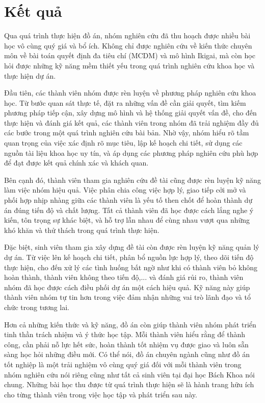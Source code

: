 \section{Kết quả}
    Qua quá trình thực hiện đồ án, nhóm nghiên cứu đã thu hoạch được nhiều bài học vô cùng quý giá và bổ ích. Không chỉ được nghiên cứu về kiến thức chuyên môn về bài toán quyết định đa tiêu chí (MCDM) và mô hình Ikigai, mà còn học hỏi được những kỹ năng mềm thiết yếu trong quá trình nghiên cứu khoa học và thực hiện dự án.
    
    Đầu tiên, các thành viên nhóm được rèn luyện về phương pháp nghiên cứu khoa học. Từ bước quan sát thực tế, đặt ra những vấn đề cần giải quyết, tìm kiếm phương pháp tiếp cận, xây dựng mô hình và hệ thống giải quyết vấn đề, cho đến thực hiện và đánh giá kết quả, các thành viên trong nhóm đã trải nghiệm đầy đủ các bước trong một quá trình nghiên cứu bài bản. Nhờ vậy, nhóm hiểu rõ tầm quan trọng của việc xác định rõ mục tiêu, lập kế hoạch chi tiết, sử dụng các nguồn tài liệu khoa học uy tín, và áp dụng các phương pháp nghiên cứu phù hợp để đạt được kết quả chính xác và khách quan.
    
    Bên cạnh đó, thành viên tham gia nghiên cứu đề tài cũng được rèn luyện kỹ năng làm việc nhóm hiệu quả. Việc phân chia công việc hợp lý, giao tiếp cởi mở và phối hợp nhịp nhàng giữa các thành viên là yếu tố then chốt để hoàn thành dự án đúng tiến độ và chất lượng. Tất cả thành viên đã học được cách lắng nghe ý kiến, tôn trọng sự khác biệt, và hỗ trợ lẫn nhau để cùng nhau vượt qua những khó khăn và thử thách trong quá trình thực hiện.
    
    Đặc biệt, sinh viên tham gia xây dựng đề tài còn được rèn luyện kỹ năng quản lý dự án. Từ việc lên kế hoạch chi tiết, phân bổ nguồn lực hợp lý, theo dõi tiến độ thực hiện, cho đến xử lý các tình huống bất ngờ như khi có thành viên bỏ không hoàn thành, thành viên không theo tiến độ,... và đánh giá rủi ro, thành viên nhóm đã học được cách điều phối dự án một cách hiệu quả. Kỹ năng này giúp thành viên nhóm tự tin hơn trong việc đảm nhận những vai trò lãnh đạo và tổ chức trong tương lai.
    
    Hơn cả những kiến thức và kỹ năng, đồ án còn giúp thành viên nhóm phát triển tinh thần trách nhiệm và ý thức học tập. Mỗi thành viên hiểu rằng để thành công, cần phải nỗ lực hết sức, hoàn thành tốt nhiệm vụ được giao và luôn sẵn sàng học hỏi những điều mới.
    Có thể nói, đồ án chuyên ngành cũng như đồ án tốt nghiệp là một trải nghiệm vô cùng quý giá đối với mỗi thành viên trong nhóm nghiên cứu nói riêng cũng như tất cả sinh viên tại đại học Bách Khoa nói chung. Những bài học thu được từ quá trình thực hiện sẽ là hành trang hữu ích cho từng thành viên trong việc học tập và phát triển sau này.
    
